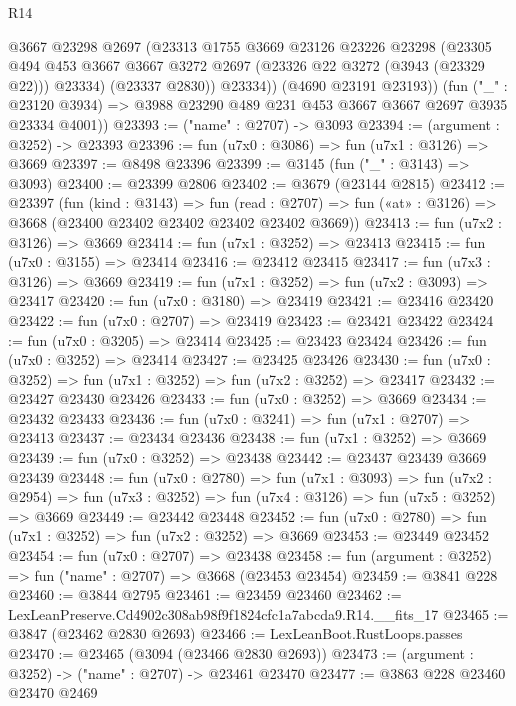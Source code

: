 \begin{lexlean}{R14}
\begin{coremodule}
            @3667
            @23298
            @2697
            (@23313
              @1755
              @3669
              @23126
              @23226
              @23298
              (@23305
                @494
                @453
                @3667
                @3667
                @3272
                @2697
                (@23326 @22 @3272 (@3943 (@23329 @22)))
                @23334)
              (@23337 @2830))
            @23334))
        (@4690 @23191 @23193))
      (fun ("_" : @23120 @3934) =>
      @3988 @23290 @489 @231 @453 @3667 @3667 @2697 @3935 @23334 @4001))
@23393 := ("name" : @2707) -> @3093
@23394 := (argument : @3252) -> @23393
@23396 := fun (u7x0 : @3086) => fun (u7x1 : @3126) => @3669
@23397 := @8498 @23396
@23399 := @3145 (fun ("_" : @3143) => @3093)
@23400 := @23399 @2806
@23402 := @3679 (@23144 @2815)
@23412 := @23397
    (fun (kind : @3143) =>
    fun (read : @2707) => fun («at» : @3126) => @3668 (@23400 @23402 @23402 @23402 @23402 @3669))
@23413 := fun (u7x2 : @3126) => @3669
@23414 := fun (u7x1 : @3252) => @23413
@23415 := fun (u7x0 : @3155) => @23414
@23416 := @23412 @23415
@23417 := fun (u7x3 : @3126) => @3669
@23419 := fun (u7x1 : @3252) => fun (u7x2 : @3093) => @23417
@23420 := fun (u7x0 : @3180) => @23419
@23421 := @23416 @23420
@23422 := fun (u7x0 : @2707) => @23419
@23423 := @23421 @23422
@23424 := fun (u7x0 : @3205) => @23414
@23425 := @23423 @23424
@23426 := fun (u7x0 : @3252) => @23414
@23427 := @23425 @23426
@23430 := fun (u7x0 : @3252) => fun (u7x1 : @3252) => fun (u7x2 : @3252) => @23417
@23432 := @23427 @23430 @23426
@23433 := fun (u7x0 : @3252) => @3669
@23434 := @23432 @23433
@23436 := fun (u7x0 : @3241) => fun (u7x1 : @2707) => @23413
@23437 := @23434 @23436
@23438 := fun (u7x1 : @3252) => @3669
@23439 := fun (u7x0 : @3252) => @23438
@23442 := @23437 @23439 @3669 @23439
@23448 := fun (u7x0 : @2780) =>
  fun (u7x1 : @3093) =>
  fun (u7x2 : @2954) => fun (u7x3 : @3252) => fun (u7x4 : @3126) => fun (u7x5 : @3252) => @3669
@23449 := @23442 @23448
@23452 := fun (u7x0 : @2780) => fun (u7x1 : @3252) => fun (u7x2 : @3252) => @3669
@23453 := @23449 @23452
@23454 := fun (u7x0 : @2707) => @23438
@23458 := fun (argument : @3252) => fun ("name" : @2707) => @3668 (@23453 @23454)
@23459 := @3841 @228
@23460 := @3844 @2795
@23461 := @23459 @23460
@23462 := LexLeanPreserve.Cd4902c308ab98f9f1824cfc1a7abcda9.R14.__fits_17
@23465 := @3847 (@23462 @2830 @2693)
@23466 := LexLeanBoot.RustLoops.passes
@23470 := @23465 (@3094 (@23466 @2830 @2693))
@23473 := (argument : @3252) -> ("name" : @2707) -> @23461 @23470
@23477 := @3863 @228 @23460 @23470 @2469

\end{coremodule}
\end{lexlean}

